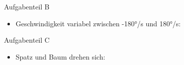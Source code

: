 \documentclass{beamer}
\begin{document}
\begin{frame}{Aufgabenteil B}
\begin{itemize}
\item Geschwindigkeit variabel zwischen -180°/s und 180°/s:
\end{itemize}
\begin{figure}
    \centering
\end{figure}
\end{frame}

\begin{frame}{Aufgabenteil C}
\begin{itemize}
\item Spatz und Baum drehen sich:
\end{itemize}
\begin{figure}
    \centering
\end{figure}
\end{frame}
\end{document}

